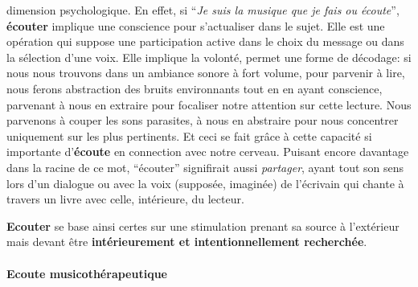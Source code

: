 dimension psychologique.
En effet, si \enquote{\emph{Je suis la musique que je fais ou écoute}}\autocite{viret:b}, \textbf{écouter} implique une conscience pour s'actualiser dans le sujet.
Elle est une opération 
qui suppose une participation active dans le choix du message
ou dans la sélection d'une voix. Elle  implique la volonté,
permet une forme de décodage:
si nous nous trouvons dans un ambiance sonore à fort volume, pour
parvenir à lire, nous
ferons abstraction des bruits environnants tout en en ayant
conscience, parvenant à nous en extraire pour focaliser notre
attention sur cette lecture. Nous parvenons à couper les sons parasites, à nous en abstraire pour
nous concentrer uniquement sur les plus  pertinents. Et ceci se fait grâce à cette capacité si importante
d'\textbf{écoute} en connection avec notre cerveau.
Puisant encore davantage dans  la racine de ce mot, ``écouter'' signifirait
aussi \emph{partager}, ayant tout son sens lors d'un dialogue ou
avec la voix (supposée, imaginée) de  l'écrivain qui
 chante à travers un livre avec celle, intérieure, du lecteur.

 
  \textbf{Ecouter} se base ainsi certes sur une stimulation prenant sa source à 
l'extérieur mais devant être \textbf{ intérieurement et intentionnellement
	recherchée}.




      \paragraph{Ecoute musicothérapeutique}
      

